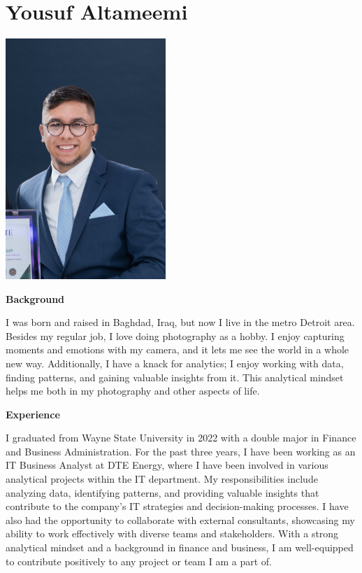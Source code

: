 \documentclass[
]{book}
\begin{document}
\hypertarget{yousuf-altameemi}{%
\section{Yousuf Altameemi}\label{yousuf-altameemi}}

\includegraphics[width=2.38542in,height=\textheight]{Headshot.jpg}

\textbf{Background}

I was born and raised in Baghdad, Iraq, but now I live in the metro Detroit area. Besides my regular job, I love doing photography as a hobby. I enjoy capturing moments and emotions with my camera, and it lets me see the world in a whole new way. Additionally, I have a knack for analytics; I enjoy working with data, finding patterns, and gaining valuable insights from it. This analytical mindset helps me both in my photography and other aspects of life.

\textbf{Experience}

I graduated from Wayne State University in 2022 with a double major in Finance and Business Administration. For the past three years, I have been working as an IT Business Analyst at DTE Energy, where I have been involved in various analytical projects within the IT department. My responsibilities include analyzing data, identifying patterns, and providing valuable insights that contribute to the company's IT strategies and decision-making processes. I have also had the opportunity to collaborate with external consultants, showcasing my ability to work effectively with diverse teams and stakeholders. With a strong analytical mindset and a background in finance and business, I am well-equipped to contribute positively to any project or team I am a part of.
\end{document}
